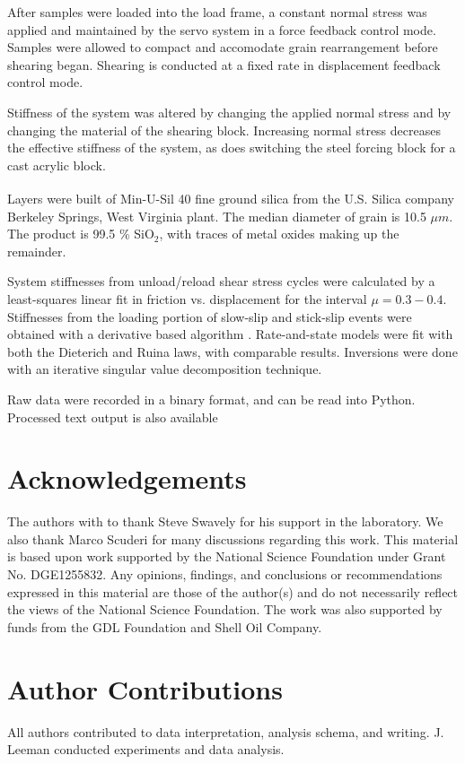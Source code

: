 \documentclass[11pt]{article}
\begin{document}
After samples were loaded into the load frame, a constant normal stress was
applied and maintained by the servo system in a force feedback control mode.
Samples were allowed to compact and accomodate grain rearrangement before
shearing began. Shearing is conducted at a fixed rate in displacement feedback
control mode.

Stiffness of the system was altered by changing the applied normal stress and by
changing the material of the shearing block. Increasing normal stress decreases
the effective stiffness of the system, as does switching the steel forcing block
for a cast acrylic block.

Layers were built of Min-U-Sil\textsuperscript{\textregistered} 40 fine ground
silica from the U.S. Silica\textsuperscript{\textregistered} company Berkeley
Springs, West Virginia plant. The median diameter of grain is 10.5 $\mu m$. The
product is 99.5 \% SiO$_2$, with traces of metal oxides making up the remainder.

System stiffnesses from unload/reload shear stress cycles were calculated by a
least-squares linear fit in friction vs. displacement for the interval $\mu =
0.3-0.4$. Stiffnesses from the loading portion of slow-slip and stick-slip
events were obtained with a derivative based algorithm \cite{Leeman:2015}.
Rate-and-state models were fit with both the Dieterich and
Ruina laws, with comparable results. Inversions were done with an iterative
singular value decomposition technique.

Raw data were recorded in a binary format, and can be read into Python\cite{Leeman:BiaxRead}.
Processed text output is also available



\section{Acknowledgements}
The authors with to thank Steve Swavely for his support in the laboratory.
We also thank Marco Scuderi for many discussions regarding this work. This
material is based upon work supported by the National Science Foundation under
Grant No. DGE1255832.  Any opinions, findings, and conclusions or
recommendations expressed in this material are those of the author(s) and do not
necessarily reflect the views of the National Science Foundation. The work was
also supported by funds from the GDL Foundation and Shell Oil Company.

\section{Author Contributions}
All authors contributed to data interpretation, analysis schema, and writing.
J. Leeman conducted experiments and data analysis.
\end{document}
